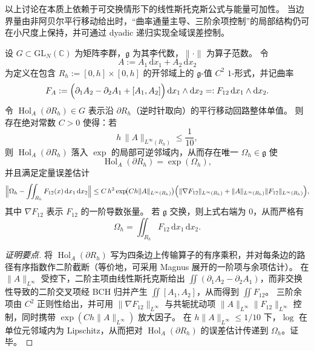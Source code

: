 



以上讨论在本质上依赖于可交换情形下的线性斯托克斯公式与能量可加性。
当边界量由非阿贝尔平行移动给出时，“曲率通量主导、三阶余项控制”的局部结构仍可在小尺度上保持，并可通过 dyadic 递归实现全域误差控制。

\begin{theorem}[非阿贝尔情形下的小矩形广义斯托克斯定量化]\label{thm:conclusion-nonabelian-stokes-small-rectangle}
设 \(G\subset \mathrm{GL}_N(\mathbb C)\) 为矩阵李群，\(\mathfrak g\) 为其李代数，\(\|\cdot\|\) 为算子范数。
令
\[
A:=A_1\,\mathrm d x_1+A_2\,\mathrm d x_2
\]
为定义在包含 \(R_h:=[0,h]\times[0,h]\) 的开邻域上的 \(\mathfrak g\)-值 \(C^2\) \(1\)-形式，并记曲率
\[
F_A
:=\Bigl(\partial_1A_2-\partial_2A_1+[A_1,A_2]\Bigr)\,\mathrm d x_1\wedge \mathrm d x_2
=:F_{12}\,\mathrm d x_1\wedge \mathrm d x_2.
\]
令 \(\operatorname{Hol}_A(\partial R_h)\in G\) 表示沿 \(\partial R_h\)（逆时针取向）的平行移动回路整体单值。
则存在绝对常数 \(C>0\) 使得：若
\[
h\,\|A\|_{L^\infty(R_h)}\le \frac{1}{10},
\]
则 \(\operatorname{Hol}_A(\partial R_h)\) 落入 \(\exp\) 的局部可逆邻域内，从而存在唯一 \(\Omega_h\in\mathfrak g\) 使
\[
\operatorname{Hol}_A(\partial R_h)=\exp(\Omega_h),
\]
并且满足定量误差估计
\[
\Bigl\|\Omega_h-\iint_{R_h}F_{12}(x)\,\mathrm d x_1\,\mathrm d x_2\Bigr\|
\le
C\,h^3\exp\!\bigl(C h\|A\|_{L^\infty(R_h)}\bigr)
\Bigl(
\|\nabla F_{12}\|_{L^\infty(R_h)}+\|A\|_{L^\infty(R_h)}\|F_{12}\|_{L^\infty(R_h)}
\Bigr),
\]
其中 \(\nabla F_{12}\) 表示 \(F_{12}\) 的一阶导数张量。
若 \(\mathfrak g\) 交换，则上式右端为 \(0\)，从而严格有
\[
\Omega_h=\iint_{R_h}F_{12}\,\mathrm d x_1\,\mathrm d x_2.
\]
\end{theorem}
\begin{proof}[证明要点]
将 \(\operatorname{Hol}_A(\partial R_h)\) 写为四条边上传输算子的有序乘积，并对每条边的路径有序指数作二阶截断（等价地，可采用 Magnus 展开的一阶项与余项估计）。
在 \(\|A\|_{L^\infty}\) 受控下，二阶主项由线性斯托克斯给出 \(\iint(\partial_1A_2-\partial_2A_1)\)，而非交换性导致的二阶交叉项经 BCH 归并产生 \(\iint[A_1,A_2]\)，从而得到 \(\iint F_{12}\)。
三阶余项由 \(C^2\) 正则性给出，并可用 \(\|\nabla F_{12}\|_{L^\infty}\) 与共轭扰动项 \(\|A\|_{L^\infty}\|F_{12}\|_{L^\infty}\) 控制，同时携带 \(\exp(C h\|A\|_{L^\infty})\) 放大因子。
在 \(h\|A\|_{L^\infty}\le 1/10\) 下，\(\log\) 在单位元邻域内为 Lipschitz，从而把对 \(\operatorname{Hol}_A(\partial R_h)\) 的误差估计传递到 \(\Omega_h\)。证毕。
\end{proof}

